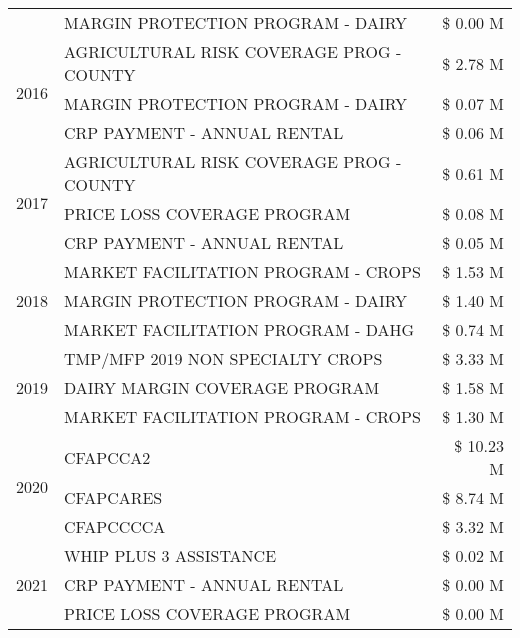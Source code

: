 \begin{tabular}{llr}
 & MARGIN PROTECTION PROGRAM - DAIRY & \$ 0.00 M \\
\cline{1-3}
\multirow[t]{3}{*}{2016} & AGRICULTURAL RISK COVERAGE PROG - COUNTY & \$ 2.78 M \\
 & MARGIN PROTECTION PROGRAM - DAIRY & \$ 0.07 M \\
 & CRP PAYMENT - ANNUAL RENTAL & \$ 0.06 M \\
\cline{1-3}
\multirow[t]{3}{*}{2017} & AGRICULTURAL RISK COVERAGE PROG - COUNTY & \$ 0.61 M \\
 & PRICE LOSS COVERAGE PROGRAM & \$ 0.08 M \\
 & CRP PAYMENT - ANNUAL RENTAL & \$ 0.05 M \\
\cline{1-3}
\multirow[t]{3}{*}{2018} & MARKET FACILITATION PROGRAM - CROPS & \$ 1.53 M \\
 & MARGIN PROTECTION PROGRAM - DAIRY & \$ 1.40 M \\
 & MARKET FACILITATION PROGRAM - DAHG & \$ 0.74 M \\
\cline{1-3}
\multirow[t]{3}{*}{2019} & TMP/MFP 2019 NON SPECIALTY CROPS & \$ 3.33 M \\
 & DAIRY MARGIN COVERAGE PROGRAM & \$ 1.58 M \\
 & MARKET FACILITATION PROGRAM - CROPS & \$ 1.30 M \\
\cline{1-3}
\multirow[t]{3}{*}{2020} & CFAPCCA2 & \$ 10.23 M \\
 & CFAPCARES & \$ 8.74 M \\
 & CFAPCCCCA & \$ 3.32 M \\
\cline{1-3}
\multirow[t]{3}{*}{2021} & WHIP PLUS 3 ASSISTANCE & \$ 0.02 M \\
 & CRP PAYMENT - ANNUAL RENTAL & \$ 0.00 M \\
 & PRICE LOSS COVERAGE PROGRAM & \$ 0.00 M \\
\cline{1-3}
\bottomrule
\end{tabular}
